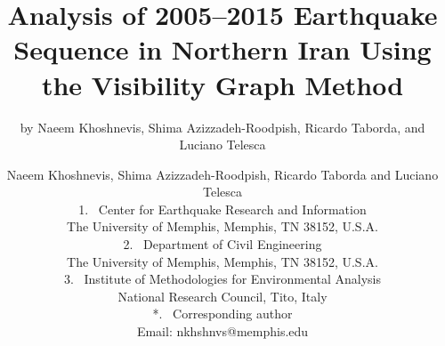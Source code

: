 
\title{%
    Analysis of 2005--2015 Earthquake Sequence in Northern Iran Using the Visibility Graph Method
}

\makeatletter
\if@twocolumn
    \date{}
    \renewcommand*\@fnsymbol[1]{\the#1}
    \author{by Naeem Khoshnevis, Shima Azizzadeh-Roodpish, Ricardo Taborda, and Luciano Telesca}
\else
    \author{
        Naeem Khoshnevis, Shima Azizzadeh-Roodpish, Ricardo Taborda and Luciano Telesca\\
        \normalsize\normalfont    	    	
        \vspace{20pt}
        1.~
        Center for Earthquake Research and Information\\
        \hspace{1.1em} The University of Memphis, Memphis, TN 38152, U.S.A.\\
        \vspace{20pt}
        2.~
        Department of Civil Engineering\\
        \hspace{1.1em} The University of Memphis, Memphis, TN 38152, U.S.A.\\
        \vspace{20pt}
        3.~
        Institute of Methodologies for Environmental Analysis\\
        \hspace{1.1em} National Research Council, Tito, Italy\\
        \vspace{20pt}
        *.~
        Corresponding author\\
        \hspace{1.1em} Email: nkhshnvs@memphis.edu\\
        \vspace{40pt}
    }
\fi
\makeatother

